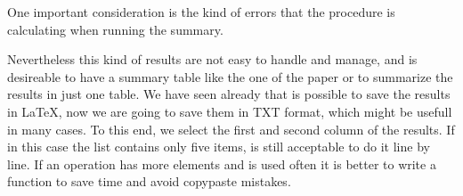 \documentclass[]{book}
\newenvironment{Shaded}{\begin{snugshade}}{\end{snugshade}}
\newcommand{\KeywordTok}[1]{\textcolor[rgb]{0.13,0.29,0.53}{\textbf{#1}}}
\newcommand{\DecValTok}[1]{\textcolor[rgb]{0.00,0.00,0.81}{#1}}
\newcommand{\StringTok}[1]{\textcolor[rgb]{0.31,0.60,0.02}{#1}}
\newcommand{\OperatorTok}[1]{\textcolor[rgb]{0.81,0.36,0.00}{\textbf{#1}}}
\newcommand{\NormalTok}[1]{#1}
\begin{document}
One important consideration is the kind of errors that the procedure is
calculating when running the summary.

Nevertheless this kind of results are not easy to handle and manage, and
is desireable to have a summary table like the one of the paper or to
summarize the results in just one table. We have seen already that is
possible to save the results in LaTeX, now we are going to save them in
TXT format, which might be usefull in many cases. To this end, we select
the first and second column of the results. If in this case the list
contains only five items, is still acceptable to do it line by line. If
an operation has more elements and is used often it is better to write a
function to save time and avoid copypaste mistakes.

\begin{Shaded}
\end{Shaded}
\end{document}
